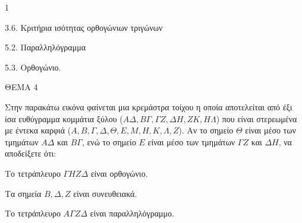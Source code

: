 \begin{ylh}{1}
    \item 3.6. Κριτήρια ισότητας ορθογώνιων τριγώνων
    \item 5.2. Παραλληλόγραμμα
    \item 5.3. Ορθογώνιο.
\end{ylh}

ΘΕΜΑ 4

Στην παρακάτω εικόνα φαίνεται μια κρεμάστρα τοίχου η οποία αποτελείται από έξι ίσα ευθύγραμμα κομμάτια ξύλου ($Α\Delta, Β\Gamma, \Gamma Z, \Delta Η, ΖΚ, Η\Lambda$) που είναι στερεωμένα με έντεκα καρφιά ($Α, Β, \Gamma, \Delta, \Theta, Ε, Μ, Η, Κ, \Lambda, Ζ$). Αν το σημείο $\Theta$ είναι μέσο των τμημάτων $Α\Delta$ και $Β\Gamma$, ενώ το σημείο $Ε$ είναι μέσο των τμημάτων $\Gamma Z$ και $\Delta Η$, να αποδείξετε ότι:

\begin{alist}
\item Το τετράπλευρο $\Gamma Η Ζ \Delta$ είναι ορθογώνιο. 
\item Τα σημεία $Β, \Delta, Ζ$ είναι συνευθειακά. 
\item Το τετράπλευρο $Α\Gamma Ζ \Delta$ είναι παραλληλόγραμμο. 

\begin{center}
\end{center}
\end{alist}

